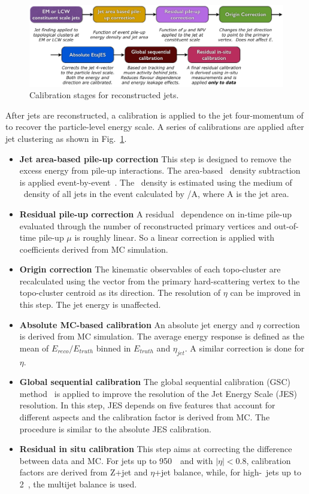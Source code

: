 \begin{figure}[htbp]
    \centering
    \includegraphics[width=1\textwidth]{chapters/c5/figures/jet_calib}
    \caption{Calibration stages for reconstructed jets.}
    \label{fig:jet-calib}
\end{figure}

\par After jets are reconstructed, a calibration is applied to the jet four-momentum of to recover the particle-level energy scale.
A series of calibrations are applied after jet clustering as shown in Fig.~\ref{fig:jet-calib}.

\begin{itemize}
    \item \textbf{Jet area-based pile-up correction} This step is designed to remove the excess energy from pile-up interactions. The area-based \pt~density subtraction is applied event-by-event~\cite{Cacciari:2007fd}. The \pt~density is estimated using the medium of \pt~density of all jets in the event calculated by \pt/A, where A is the jet area.
    \item \textbf{Residual pile-up correction} A residual \pt~dependence on in-time pile-up evaluated through the number of reconstructed primary vertices and out-of-time pile-up $\mu$ is roughly linear. So a linear correction is applied with coefficients derived from MC simulation. 
    \item \textbf{Origin correction} The kinematic observables of each topo-cluster are recalculated using the vector from the primary hard-scattering vertex to the topo-cluster centroid as its direction. The resolution of $\eta$ can be improved in this step. The jet energy is unaffected.
    \item \textbf{Absolute MC-based calibration} An absolute jet energy and $\eta$ correction is derived from MC simulation. The average energy response is defined as the mean of $E_{reco}/E_{truth}$ binned in $E_{truth}$ and $\eta_{jet}$. A similar correction is done for $\eta$.
    \item \textbf{Global sequential calibration} The global sequential calibration (GSC) method~\cite{Aad:2011he} is applied to improve the resolution of the Jet Energy Scale (JES) resolution. In this step, JES depends on five features that account for different aspects and the calibration factor is derived from MC. The procedure is similar to the absolute JES calibration.
    \item \textbf{Residual in situ calibration} This step aims at correcting the difference between data and MC. For jets up to 950~\GeV~and with $|\eta| < 0.8$, calibration factors are derived from Z+jet and $\eta$+jet balance, while, for high-\pt~jets up to 2~\TeV, the multijet balance is used.
\end{itemize}


